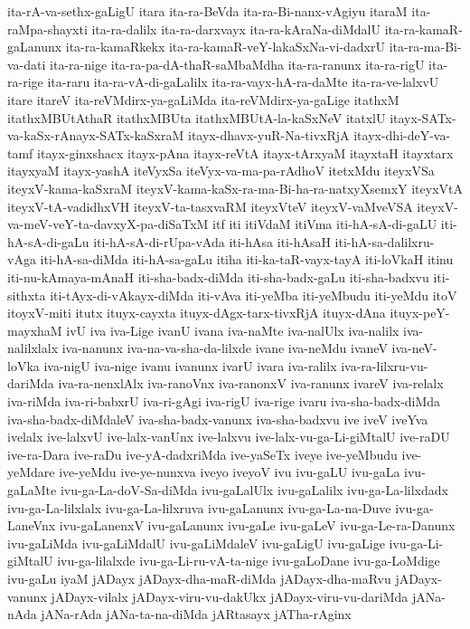 {ita-rA-va-sethx-gaLigU
itara
ita-ra-BeVda
ita-ra-Bi-nanx-vAgiyu
itaraM
ita-raMpa-shayxti
ita-ra-dalilx
ita-ra-darxvayx
ita-ra-kAraNa-diMdalU
ita-ra-kamaR-gaLanunx
ita-ra-kamaRkekx
ita-ra-kamaR-veY-lakaSxNa-vi-dadxrU
ita-ra-ma-Bi-va-dati
ita-ra-nige
ita-ra-pa-dA-thaR-saMbaMdha
ita-ra-ranunx
ita-ra-rigU
ita-ra-rige
ita-raru
ita-ra-vA-di-gaLalilx
ita-ra-vayx-hA-ra-daMte
ita-ra-ve-lalxvU
itare
itareV
ita-reVMdirx-ya-gaLiMda
ita-reVMdirx-ya-gaLige
itathxM
itathxMBUtAthaR
itathxMBUta
itathxMBUtA-la-kaSxNeV
itatxlU
itayx-SATx-va-kaSx-rAnayx-SATx-kaSxraM
itayx-dhavx-yuR-Na-tivxRjA
itayx-dhi-deY-va-tamf
itayx-ginxshacx
itayx-pAna
itayx-reVtA
itayx-tArxyaM
itayxtaH
itayxtarx
itayxyaM
itayx-yashA
iteVyxSa
iteVyx-va-ma-pa-rAdhoV
itetxMdu
iteyxVSa
iteyxV-kama-kaSxraM
iteyxV-kama-kaSx-ra-ma-Bi-ha-ra-natxyXsemxY
iteyxVtA
iteyxV-tA-vadidhxVH
iteyxV-ta-tasxvaRM
iteyxVteV
iteyxV-vaMveVSA
iteyxV-va-meV-veY-ta-davxyX-pa-diSaTxM
itf
iti
itiVdaM
itiVma
iti-hA-sA-di-gaLU
iti-hA-sA-di-gaLu
iti-hA-sA-di-rUpa-vAda
iti-hAsa
iti-hAsaH
iti-hA-sa-dalilxru-vAga
iti-hA-sa-diMda
iti-hA-sa-gaLu
itiha
iti-ka-taR-vayx-tayA
iti-loVkaH
itinu
iti-nu-kAmaya-mAnaH
iti-sha-badx-diMda
iti-sha-badx-gaLu
iti-sha-badxvu
iti-sithxta
iti-tAyx-di-vAkayx-diMda
iti-vAva
iti-yeMba
iti-yeMbudu
iti-yeMdu
itoV
itoyxV-miti
itutx
ituyx-cayxta
ituyx-dAgx-tarx-tivxRjA
ituyx-dAna
ituyx-peY-mayxhaM
ivU
iva
iva-Lige
ivanU
ivana
iva-naMte
iva-nalUlx
iva-nalilx
iva-nalilxlalx
iva-nanunx
iva-na-va-sha-da-lilxde
ivane
iva-neMdu
ivaneV
iva-neV-loVka
iva-nigU
iva-nige
ivanu
ivanunx
ivarU
ivara
iva-ralilx
iva-ra-lilxru-vu-dariMda
iva-ra-nenxlAlx
iva-ranoVnx
iva-ranonxV
iva-ranunx
ivareV
iva-relalx
iva-riMda
iva-ri-babxrU
iva-ri-gAgi
iva-rigU
iva-rige
ivaru
iva-sha-badx-diMda
iva-sha-badx-diMdaleV
iva-sha-badx-vanunx
iva-sha-badxvu
ive
iveV
iveYva
ivelalx
ive-lalxvU
ive-lalx-vanUnx
ive-lalxvu
ive-lalx-vu-ga-Li-giMtalU
ive-raDU
ive-ra-Dara
ive-raDu
ive-yA-dadxriMda
ive-yaSeTx
iveye
ive-yeMbudu
ive-yeMdare
ive-yeMdu
ive-ye-nunxva
iveyo
iveyoV
ivu
ivu-gaLU
ivu-gaLa
ivu-gaLaMte
ivu-ga-La-doV-Sa-diMda
ivu-gaLalUlx
ivu-gaLalilx
ivu-ga-La-lilxdadx
ivu-ga-La-lilxlalx
ivu-ga-La-lilxruva
ivu-gaLanunx
ivu-ga-La-na-Duve
ivu-ga-LaneVnx
ivu-gaLanenxV
ivu-gaLanunx
ivu-gaLe
ivu-gaLeV
ivu-ga-Le-ra-Danunx
ivu-gaLiMda
ivu-gaLiMdalU
ivu-gaLiMdaleV
ivu-gaLigU
ivu-gaLige
ivu-ga-Li-giMtalU
ivu-ga-lilalxde
ivu-ga-Li-ru-vA-ta-nige
ivu-gaLoDane
ivu-ga-LoMdige
ivu-gaLu
iyaM
jADayx
jADayx-dha-maR-diMda
jADayx-dha-maRvu
jADayx-vanunx
jADayx-vilalx
jADayx-viru-vu-dakUkx
jADayx-viru-vu-dariMda
jANa-nAda
jANa-rAda
jANa-ta-na-diMda
jARtasayx
jATha-rAginx
}
